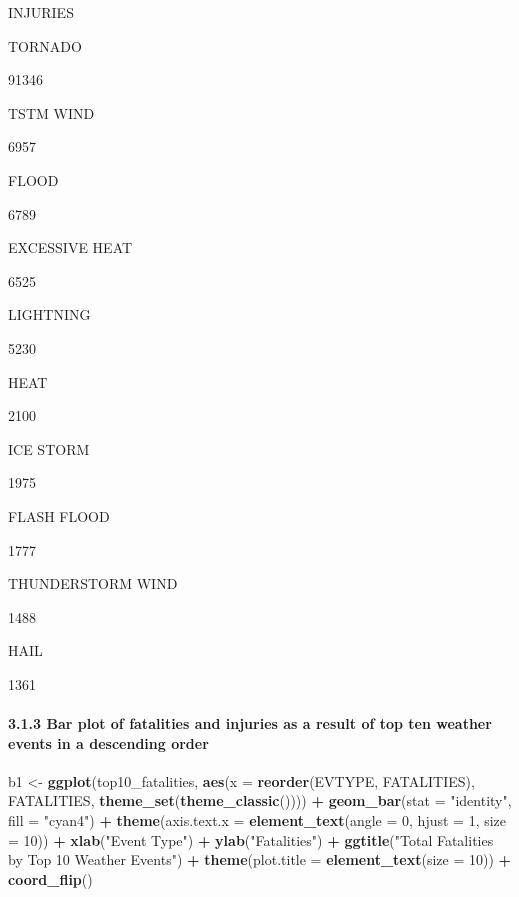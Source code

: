 \documentclass[]{article}
\newenvironment{Shaded}{\begin{snugshade}}{\end{snugshade}}
\newcommand{\DataTypeTok}[1]{\textcolor[rgb]{0.13,0.29,0.53}{#1}}
\newcommand{\DecValTok}[1]{\textcolor[rgb]{0.00,0.00,0.81}{#1}}
\newcommand{\KeywordTok}[1]{\textcolor[rgb]{0.13,0.29,0.53}{\textbf{#1}}}
\newcommand{\NormalTok}[1]{#1}
\newcommand{\OperatorTok}[1]{\textcolor[rgb]{0.81,0.36,0.00}{\textbf{#1}}}
\newcommand{\StringTok}[1]{\textcolor[rgb]{0.31,0.60,0.02}{#1}}
\let\oldparagraph\paragraph
\renewcommand{\paragraph}[1]{\oldparagraph{#1}\mbox{}}
\begin{document}
INJURIES

TORNADO

91346

TSTM WIND

6957

FLOOD

6789

EXCESSIVE HEAT

6525

LIGHTNING

5230

HEAT

2100

ICE STORM

1975

FLASH FLOOD

1777

THUNDERSTORM WIND

1488

HAIL

1361

\hypertarget{bar-plot-of-fatalities-and-injuries-as-a-result-of-top-ten-weather-events-in-a-descending-order}{%
\paragraph{3.1.3 Bar plot of fatalities and injuries as a result of top
ten weather events in a descending
order}\label{bar-plot-of-fatalities-and-injuries-as-a-result-of-top-ten-weather-events-in-a-descending-order}}

\begin{Shaded}
\begin{Highlighting}[]
\NormalTok{b1 <-}\StringTok{ }\KeywordTok{ggplot}\NormalTok{(top10_fatalities, }\KeywordTok{aes}\NormalTok{(}\DataTypeTok{x =} \KeywordTok{reorder}\NormalTok{(EVTYPE, FATALITIES), FATALITIES, }\KeywordTok{theme_set}\NormalTok{(}\KeywordTok{theme_classic}\NormalTok{()))) }\OperatorTok{+}\StringTok{ }
\StringTok{        }\KeywordTok{geom_bar}\NormalTok{(}\DataTypeTok{stat =} \StringTok{"identity"}\NormalTok{, }\DataTypeTok{fill =} \StringTok{"cyan4"}\NormalTok{) }\OperatorTok{+}\StringTok{ }
\StringTok{        }\KeywordTok{theme}\NormalTok{(}\DataTypeTok{axis.text.x =} \KeywordTok{element_text}\NormalTok{(}\DataTypeTok{angle =} \DecValTok{0}\NormalTok{, }\DataTypeTok{hjust =} \DecValTok{1}\NormalTok{, }\DataTypeTok{size =} \DecValTok{10}\NormalTok{)) }\OperatorTok{+}\StringTok{ }
\StringTok{        }\KeywordTok{xlab}\NormalTok{(}\StringTok{"Event Type"}\NormalTok{) }\OperatorTok{+}\StringTok{ }\KeywordTok{ylab}\NormalTok{(}\StringTok{"Fatalities"}\NormalTok{) }\OperatorTok{+}\StringTok{ }\KeywordTok{ggtitle}\NormalTok{(}\StringTok{"Total Fatalities by Top 10 Weather Events"}\NormalTok{) }\OperatorTok{+}
\StringTok{        }\KeywordTok{theme}\NormalTok{(}\DataTypeTok{plot.title =} \KeywordTok{element_text}\NormalTok{(}\DataTypeTok{size =} \DecValTok{10}\NormalTok{)) }\OperatorTok{+}\StringTok{ }\KeywordTok{coord_flip}\NormalTok{()}
\end{Highlighting}
\end{Shaded}
\end{document}
